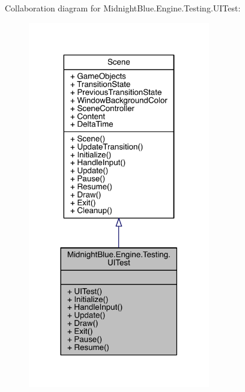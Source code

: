 Collaboration diagram for Midnight\+Blue.\+Engine.\+Testing.\+U\+I\+Test\+:
\nopagebreak
\begin{figure}[H]
\begin{center}
\leavevmode
\includegraphics[width=225pt]{class_midnight_blue_1_1_engine_1_1_testing_1_1_u_i_test__coll__graph}
\end{center}
\end{figure}
